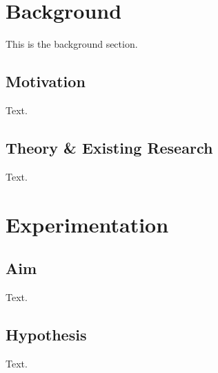\documentclass[a4paper, 12pt, english]{article}
\begin{document}

    \fullPageTitle

    \thispagestyle{noheader}
    \tableofcontents

    \vspace{2em}
    \listoffigures

    \vspace{2em}
    \listoftables

    \newpage

    \section{Background}
        \label{sec: background}
        
        This is the background section.
    

        \subsection{Motivation}
            \label{subsec: motivation}

            Text.


        \subsection{Theory \& Existing Research}
            \label{subsec: theory and existing research}

            Text.

    
    \section{Experimentation}
        \label{sec: experimentation}

        \subsection{Aim}
            \label{subsec: aim}

            Text.

            
        \subsection{Hypothesis}
            \label{subsec: hypothesis}

            Text.
\end{document}
